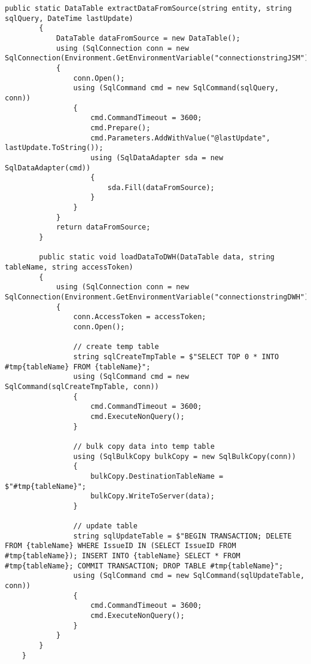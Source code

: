\begin{lstlisting}[frame=single,caption=ETL-Prozess: Aufruf der Funktion,captionpos=b]
  public static DataTable extractDataFromSource(string entity, string sqlQuery, DateTime lastUpdate)
        {
            DataTable dataFromSource = new DataTable();
            using (SqlConnection conn = new SqlConnection(Environment.GetEnvironmentVariable("connectionstringJSM")))
            {
                conn.Open();
                using (SqlCommand cmd = new SqlCommand(sqlQuery, conn))
                {
                    cmd.CommandTimeout = 3600;
                    cmd.Prepare();
                    cmd.Parameters.AddWithValue("@lastUpdate", lastUpdate.ToString());
                    using (SqlDataAdapter sda = new SqlDataAdapter(cmd))
                    {
                        sda.Fill(dataFromSource);
                    }
                }
            }
            return dataFromSource;
        }

        public static void loadDataToDWH(DataTable data, string tableName, string accessToken)
        {
            using (SqlConnection conn = new SqlConnection(Environment.GetEnvironmentVariable("connectionstringDWH")))
            {
                conn.AccessToken = accessToken;
                conn.Open();

                // create temp table
                string sqlCreateTmpTable = $"SELECT TOP 0 * INTO #tmp{tableName} FROM {tableName}";
                using (SqlCommand cmd = new SqlCommand(sqlCreateTmpTable, conn))
                {
                    cmd.CommandTimeout = 3600;
                    cmd.ExecuteNonQuery();
                }

                // bulk copy data into temp table
                using (SqlBulkCopy bulkCopy = new SqlBulkCopy(conn))
                {
                    bulkCopy.DestinationTableName = $"#tmp{tableName}";
                    bulkCopy.WriteToServer(data);
                }

                // update table
                string sqlUpdateTable = $"BEGIN TRANSACTION; DELETE FROM {tableName} WHERE IssueID IN (SELECT IssueID FROM #tmp{tableName}); INSERT INTO {tableName} SELECT * FROM #tmp{tableName}; COMMIT TRANSACTION; DROP TABLE #tmp{tableName}";
                using (SqlCommand cmd = new SqlCommand(sqlUpdateTable, conn))
                {
                    cmd.CommandTimeout = 3600;
                    cmd.ExecuteNonQuery();
                }
            }
        }
    }
\end{lstlisting}